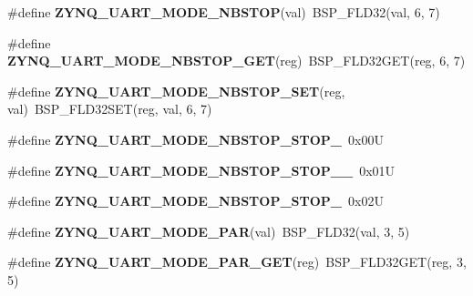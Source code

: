 \begin{DoxyCompactItemize}
\item 
\mbox{\label{zynq-uart-regs_8h_a055307fa588d02ecc34fad65fcab065c}} 
\#define {\bfseries Z\+Y\+N\+Q\+\_\+\+U\+A\+R\+T\+\_\+\+M\+O\+D\+E\+\_\+\+N\+B\+S\+T\+OP}(val)~B\+S\+P\+\_\+\+F\+L\+D32(val, 6, 7)
\item 
\mbox{\label{zynq-uart-regs_8h_a96e4e8031ddeb9b1d1b511cb8c2df931}} 
\#define {\bfseries Z\+Y\+N\+Q\+\_\+\+U\+A\+R\+T\+\_\+\+M\+O\+D\+E\+\_\+\+N\+B\+S\+T\+O\+P\+\_\+\+G\+ET}(reg)~B\+S\+P\+\_\+\+F\+L\+D32\+G\+ET(reg, 6, 7)
\item 
\mbox{\label{zynq-uart-regs_8h_ad9459dc33247afaef4d42eb70ab772ab}} 
\#define {\bfseries Z\+Y\+N\+Q\+\_\+\+U\+A\+R\+T\+\_\+\+M\+O\+D\+E\+\_\+\+N\+B\+S\+T\+O\+P\+\_\+\+S\+ET}(reg,  val)~B\+S\+P\+\_\+\+F\+L\+D32\+S\+ET(reg, val, 6, 7)
\item 
\mbox{\label{zynq-uart-regs_8h_acb1225c0665e94933ed3179a5f567d36}} 
\#define {\bfseries Z\+Y\+N\+Q\+\_\+\+U\+A\+R\+T\+\_\+\+M\+O\+D\+E\+\_\+\+N\+B\+S\+T\+O\+P\+\_\+\+S\+T\+O\+P\+\_}~0x00U
\item 
\mbox{\label{zynq-uart-regs_8h_aa832ba1c89c8a11821d289740312f5f9}} 
\#define {\bfseries Z\+Y\+N\+Q\+\_\+\+U\+A\+R\+T\+\_\+\+M\+O\+D\+E\+\_\+\+N\+B\+S\+T\+O\+P\+\_\+\+S\+T\+O\+P\+\_\+\_}~0x01U
\item 
\mbox{\label{zynq-uart-regs_8h_a120f800f0e41e762bc14f0b33728046f}} 
\#define {\bfseries Z\+Y\+N\+Q\+\_\+\+U\+A\+R\+T\+\_\+\+M\+O\+D\+E\+\_\+\+N\+B\+S\+T\+O\+P\+\_\+\+S\+T\+O\+P\+\_}~0x02U
\item 
\mbox{\label{zynq-uart-regs_8h_a0e92fc1c190a1b862e5ea7897aeee0ad}} 
\#define {\bfseries Z\+Y\+N\+Q\+\_\+\+U\+A\+R\+T\+\_\+\+M\+O\+D\+E\+\_\+\+P\+AR}(val)~B\+S\+P\+\_\+\+F\+L\+D32(val, 3, 5)
\item 
\mbox{\label{zynq-uart-regs_8h_accd127256ef9a5b4a4505013876e6d64}} 
\#define {\bfseries Z\+Y\+N\+Q\+\_\+\+U\+A\+R\+T\+\_\+\+M\+O\+D\+E\+\_\+\+P\+A\+R\+\_\+\+G\+ET}(reg)~B\+S\+P\+\_\+\+F\+L\+D32\+G\+ET(reg, 3, 5)
\item 
\mbox{\label{zynq-uart-regs_8h_a93d664a4aba922c252dca3f35b132e0e}} 

\end{DoxyCompactItemize}
